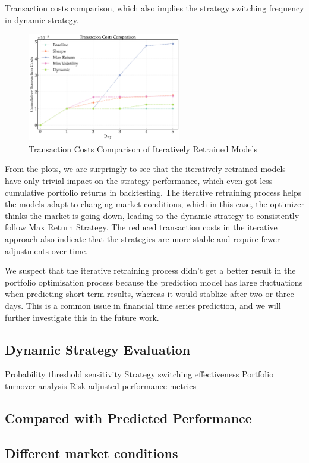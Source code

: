 Transaction costs comparison, which also implies the strategy switching frequency in dynamic strategy.

\begin{figure}[htbp]
    \centering
    \includegraphics[width=0.6\textwidth]{figures/trx_costs_comparison_final.png}
    \caption{Transaction Costs Comparison of Iteratively Retrained Models}
    \label{fig:trx_costs_comparison_iterative}
\end{figure}

From the plots, we are surpringly to see that the iteratively retrained models have only trivial impact on the strategy performance, which even got less cumulative portfolio returns in backtesting. The iterative retraining process helps the models adapt to changing market conditions, which in this case, the optimizer thinks the market is going down, leading to the dynamic strategy to consistently follow Max Return Strategy. The reduced transaction costs in the iterative approach also indicate that the strategies are more stable and require fewer adjustments over time.

We suspect that the iterative retraining process didn't get a better result in the portfolio optimisation process because the prediction model has large fluctuations when predicting short-term results, whereas it would stablize after two or three days. This is a common issue in financial time series prediction, and we will further investigate this in the future work.
\subsection{Dynamic Strategy Evaluation}
Probability threshold sensitivity
Strategy switching effectiveness
Portfolio turnover analysis
Risk-adjusted performance metrics


\subsection{Compared with Predicted Performance}


\subsection{Different market conditions}

